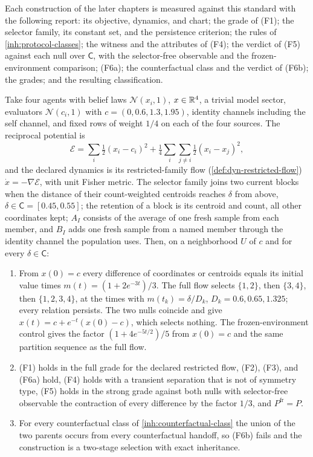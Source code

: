 Each construction of the later chapters is measured against this standard
with the following report: its objective, dynamics, and chart; the grade of
(F1); the selector family, its constant set, and the persistence criterion;
the rules of \cref{inh:protocol-classes}; the witness and the attributes of
(F4); the verdict of (F5) against each null over $\mathsf C$, with the
selector-free observable and the frozen-environment comparison; (F6a); the
counterfactual class and the verdict of (F6b); the grades; and the resulting
classification.

Take four agents with belief laws $\mathcal N(x_i,1)$, $x\in\mathbb R^4$, a trivial
model sector, evaluators $\mathcal N(c_i,1)$ with
$c=(0,0.6,1.3,1.95)$, identity channels including the self channel, and
fixed rows of weight $1/4$ on each of the four sources. The reciprocal
potential is
\begin{equation}
 \mathcal E=\sum_i\tfrac12(x_i-c_i)^2
 +\tfrac14\sum_i\sum_{j\neq i}\tfrac12(x_i-x_j)^2,
 \label{inh:anchored-potential}
\end{equation}
and the declared dynamics is its restricted-family flow
(\cref{def:dyn-restricted-flow}) $\dot x=-\nabla\mathcal E$, with unit Fisher
metric. The selector family joins two current blocks when the distance of
their count-weighted centroids reaches $\delta$ from above,
$\delta\in\mathsf C=[0.45,0.55]$; the retention of a block is its centroid
and count, all other coordinates kept; $A_I$ consists of the average of one
fresh sample from each member, and $B_I$ adds one fresh sample from a named
member through the identity channel the population uses. Then, on a
neighborhood $U$ of $c$ and for every $\delta\in\mathsf C$:
\begin{enumerate}
\item[(i)] From $x(0)=c$ every difference of coordinates or centroids equals
its initial value times $m(t)=(1+2e^{-3t})/3$. The full flow selects
$\{1,2\}$, then $\{3,4\}$, then $\{1,2,3,4\}$, at the times with
$m(t_k)=\delta/D_k$, $D_k=0.6,0.65,1.325$; every relation persists. The two
nulls coincide and give $x(t)=c+e^{-t}(x(0)-c)$, which selects nothing. The
frozen-environment control gives the factor $(1+4e^{-5t/2})/5$ from $x(0)=c$
and the same partition sequence as the full flow.
\item[(ii)] (F1) holds in the full grade for the declared restricted flow,
(F2), (F3), and (F6a) hold, (F4) holds with a transient separation that is
not of symmetry type, (F5) holds in the strong grade against both nulls with
selector-free observable the contraction of every difference by the factor
$1/3$, and $P^{\mathrm{fr}}=P$.
\item[(iii)] For every counterfactual class of \cref{inh:counterfactual-class}
the union of the two parents occurs from every counterfactual handoff, so
(F6b) fails and the construction is a two-stage selection with exact
inheritance.
\end{enumerate}

